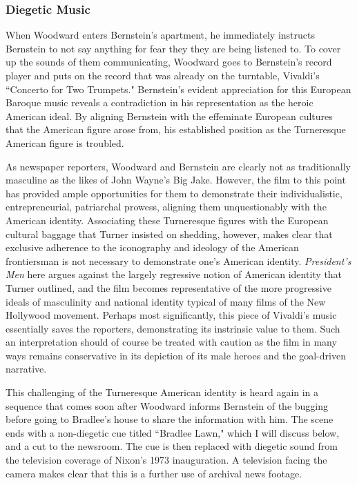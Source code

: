 \subsubsection{Diegetic Music}

When Woodward enters Bernstein's apartment, he immediately instructs Bernstein to not say anything for fear they they are being listened to.
To cover up the sounds of them communicating, Woodward goes to Bernstein's record player and puts on the record that was already on the turntable, Vivaldi's ``Concerto for Two Trumpets."
Bernstein's evident appreciation for this European Baroque music reveals a contradiction in his representation as the heroic American ideal.
By aligning Bernstein with the effeminate European cultures that the American figure arose from, his established position as the Turneresque American figure is troubled.

As newspaper reporters, Woodward and Bernstein are clearly not as traditionally masculine as the likes of John Wayne's Big Jake.
However, the film to this point has provided ample opportunities for them to demonstrate their individualistic, entrepreneurial, patriarchal prowess, aligning them unquestionably with the American identity.
Associating these Turneresque figures with the European cultural baggage that Turner insisted on shedding, however, makes clear that exclusive adherence to the iconography and ideology of the American frontiersman is not necessary to demonstrate one's American identity.
\textit{President's Men} here argues against the largely regressive notion of American identity that Turner outlined, and the film becomes representative of the more progressive ideals of masculinity and national identity typical of many films of the New Hollywood movement.
Perhaps most significantly, this piece of Vivaldi's music essentially saves the reporters, demonstrating its instrinsic value to them.
Such an interpretation should of course be treated with caution as the film in many ways remains conservative in its depiction of its male heroes and the goal-driven narrative.

This challenging of the Turneresque American identity is heard again in a sequence that comes soon after Woodward informs Bernstein of the bugging before going to Bradlee's house to share the information with him.
The scene ends with a non-diegetic cue titled ``Bradlee Lawn," which I will discuss below, and a cut to the newsroom.
The cue is then replaced with diegetic sound from the television coverage of Nixon's 1973 inauguration.
A television facing the camera makes clear that this is a further use of archival news footage.

